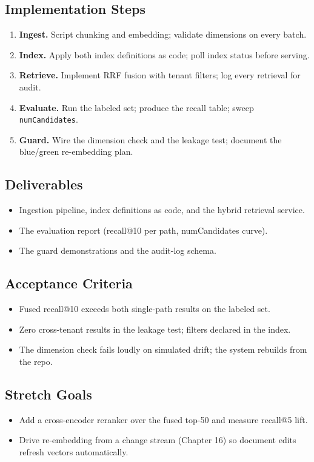 \subsection*{Implementation Steps}
\begin{enumerate}
    \item \textbf{Ingest.} Script chunking and embedding; validate dimensions on every batch.
    \item \textbf{Index.} Apply both index definitions as code; poll index status before serving.
    \item \textbf{Retrieve.} Implement RRF fusion with tenant filters; log every retrieval for audit.
    \item \textbf{Evaluate.} Run the labeled set; produce the recall table; sweep \texttt{numCandidates}.
    \item \textbf{Guard.} Wire the dimension check and the leakage test; document the blue/green re-embedding plan.
\end{enumerate}

\subsection*{Deliverables}
\begin{itemize}
    \item Ingestion pipeline, index definitions as code, and the hybrid retrieval service.
    \item The evaluation report (recall@10 per path, numCandidates curve).
    \item The guard demonstrations and the audit-log schema.
\end{itemize}

\subsection*{Acceptance Criteria}
\begin{itemize}
    \item Fused recall@10 exceeds both single-path results on the labeled set.
    \item Zero cross-tenant results in the leakage test; filters declared in the index.
    \item The dimension check fails loudly on simulated drift; the system rebuilds from the repo.
\end{itemize}

\subsection*{Stretch Goals}
\begin{itemize}
    \item Add a cross-encoder reranker over the fused top-50 and measure recall@5 lift.
    \item Drive re-embedding from a change stream (Chapter 16) so document edits refresh vectors automatically.
\end{itemize}
